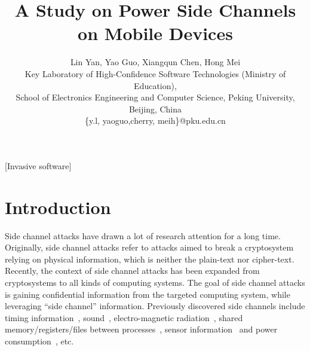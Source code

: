 \documentclass{sig-alternate}
\begin{document}
\title{A Study on Power Side Channels on Mobile Devices}


\author{
\alignauthor
\large{Lin Yan, Yao Guo, Xiangqun Chen, Hong Mei} \\
\normalsize{Key Laboratory of High-Confidence Software Technologies (Ministry of Education), \\ School of Electronics Engineering and Computer Science, Peking University, Beijing, China} \\
 \normalsize{\{y.l, yaoguo,cherry, meih\}@pku.edu.cn}
}

\maketitle
{}

[Invasive software]



\section{Introduction}
Side channel attacks have drawn a lot of research attention for a long time. Originally, side channel attacks refer to attacks aimed to break a cryptosystem relying on physical information, which is neither the plain-text nor cipher-text. Recently, the context of side channel attacks has been expanded from cryptosystems to all kinds of computing systems. 
The goal of side channel attacks is gaining confidential information from the targeted computing system, while leveraging ``side channel'' information. Previously discovered side channels include timing information~\cite{Bortz:2007, Chen:2010}, sound~\cite{Zhuang:2009, Das:2014}, electro-magnetic radiation~\cite{Vuagnoux:2009}, shared memory/registers/files between processes~\cite{zhou:2013, Zhang:2009}, sensor information~\cite{placeraider-ndss13, schlegel:2011} and power consumption~\cite{kocher1999differential, MichalevskyNSB15}, etc.
\end{document}
